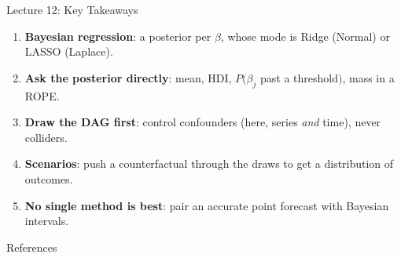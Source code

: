 \documentclass[aspectratio=169, 11pt]{beamer}
\begin{document}
\begin{frame}{Lecture 12: Key Takeaways}
  \begin{keybox}
    {\small
    \begin{enumerate}
      \item \textbf{Bayesian regression}: a posterior per $\beta$, whose mode is Ridge (Normal)
            or LASSO (Laplace).
      \item \textbf{Ask the posterior directly}: mean, HDI, $P(\beta_j$ past a threshold$)$, mass in
            a ROPE.
      \item \textbf{Draw the DAG first}: control confounders (here, series \emph{and} time),
            never colliders.
      \item \textbf{Scenarios}: push a counterfactual through the draws to get a distribution of
            outcomes.
      \item \textbf{No single method is best}: pair an accurate point forecast with Bayesian
            intervals.
    \end{enumerate}
    }
  \end{keybox}
\end{frame}

\begin{frame}[allowframebreaks]{References}
  \printbibliography[heading=none]
\end{frame}

\end{document}

